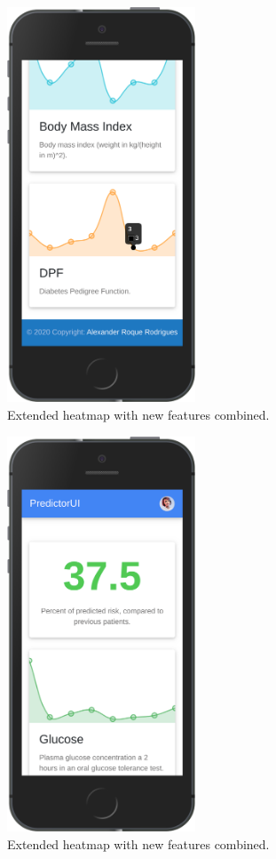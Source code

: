 \documentclass[12pt]{article}
\begin{document}
\begin{figure}[ht]
\centering
\includegraphics[width=0.5\textwidth]{3se.png}
\caption{\label{fig:52} Extended heatmap with new features combined.}
\end{figure}
\begin{figure}[ht]
\centering
\includegraphics[width=0.5\textwidth]{4se.png}
\caption{\label{fig:53} Extended heatmap with new features combined.}
\end{figure}
\end{document}
